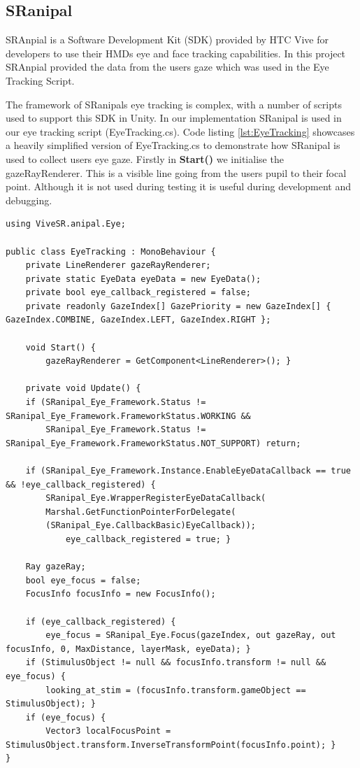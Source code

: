 \documentclass{l4proj}
\begin{document}
\subsection{SRanipal} \label{SRAnpial}
SRAnpial is a Software Development Kit (SDK) provided by HTC Vive for developers to use their HMDs eye and face tracking capabilities. In this project SRAnpial provided the data from the users gaze which was used in the Eye Tracking Script.

The framework of SRanipals eye tracking is complex, with a number of scripts used to support this SDK in Unity. In our implementation SRanipal is used in our eye tracking script (EyeTracking.cs). Code listing \ref{lst:EyeTracking} showcases a heavily simplified version of EyeTracking.cs to demonstrate how SRanipal is used to collect users eye gaze. 
\newline
Firstly in \textbf{Start()} we initialise the gazeRayRenderer. This is a visible line going from the users pupil to their focal point. Although it is not used during testing it is useful during development and debugging.
\begin{lstlisting}[language={[Sharp]C}, float=h!, caption={Simplified exert from EyeTracking.cs. Showcasing SRanipal SDK.}]
using ViveSR.anipal.Eye;

public class EyeTracking : MonoBehaviour {
    private LineRenderer gazeRayRenderer;
    private static EyeData eyeData = new EyeData();
    private bool eye_callback_registered = false;
    private readonly GazeIndex[] GazePriority = new GazeIndex[] { GazeIndex.COMBINE, GazeIndex.LEFT, GazeIndex.RIGHT };

    void Start() {
        gazeRayRenderer = GetComponent<LineRenderer>(); }
    
    private void Update() {
    if (SRanipal_Eye_Framework.Status != SRanipal_Eye_Framework.FrameworkStatus.WORKING &&
        SRanipal_Eye_Framework.Status != SRanipal_Eye_Framework.FrameworkStatus.NOT_SUPPORT) return;

    if (SRanipal_Eye_Framework.Instance.EnableEyeDataCallback == true && !eye_callback_registered) { 
        SRanipal_Eye.WrapperRegisterEyeDataCallback(
        Marshal.GetFunctionPointerForDelegate(
        (SRanipal_Eye.CallbackBasic)EyeCallback));
            eye_callback_registered = true; }

    Ray gazeRay;
    bool eye_focus = false;
    FocusInfo focusInfo = new FocusInfo();

    if (eye_callback_registered) {
        eye_focus = SRanipal_Eye.Focus(gazeIndex, out gazeRay, out focusInfo, 0, MaxDistance, layerMask, eyeData); }
    if (StimulusObject != null && focusInfo.transform != null && eye_focus) {
        looking_at_stim = (focusInfo.transform.gameObject == StimulusObject); }  
    if (eye_focus) {
        Vector3 localFocusPoint = StimulusObject.transform.InverseTransformPoint(focusInfo.point); }
}
\end{lstlisting} \label{lst:EyeTracking}
\end{document}
